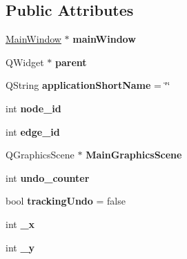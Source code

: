 \subsection*{Public Attributes}
\begin{DoxyCompactItemize}
\item 
\mbox{\label{class_graph_widget_a7e10f35f59a43d87694c218212604329}} 
\hyperlink{class_main_window}{Main\+Window} $\ast$ {\bfseries main\+Window}
\item 
\mbox{\label{class_graph_widget_ac34853b98bb0c769b6fff9effa5d6fb2}} 
Q\+Widget $\ast$ {\bfseries parent}
\item 
\mbox{\label{class_graph_widget_a56cbcb6b31e785c0b1bb64e76fa7a97e}} 
Q\+String {\bfseries application\+Short\+Name} = \char`\"{}\char`\"{}
\item 
\mbox{\label{class_graph_widget_abb7a87dbdf2237d8fd3e5783a1162a27}} 
int {\bfseries node\+\_\+id}
\item 
\mbox{\label{class_graph_widget_a7e27ab3b07f2c2abea1a5836b03fe988}} 
int {\bfseries edge\+\_\+id}
\item 
\mbox{\label{class_graph_widget_ab7fa6ef7a90b5136fbd74038422ccf34}} 
Q\+Graphics\+Scene $\ast$ {\bfseries Main\+Graphics\+Scene}
\item 
\mbox{\label{class_graph_widget_a50960360aa798d88bcde2eeee6ff91fa}} 
int {\bfseries undo\+\_\+counter}
\item 
\mbox{\label{class_graph_widget_abc8fbdb6df9d47b275e65ef2fc1c5791}} 
bool {\bfseries tracking\+Undo} = false
\item 
\mbox{\label{class_graph_widget_a6b189dd631714651292c5f39fa286577}} 
int {\bfseries \+\_\+x}
\item 
\mbox{\label{class_graph_widget_a4e3d9b1e7dfd5f6a18a701447acbb742}} 
int {\bfseries \+\_\+y}
\item 
\mbox{\label{class_graph_widget_a8fffafff3013a4b4b8d61f9d3c1f83ad}} 

\end{DoxyCompactItemize}
